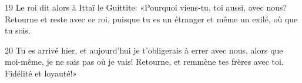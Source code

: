 
19 Le roi dit alors à Ittaï le Guittite: «Pourquoi viens-tu, toi aussi, avec nous? Retourne et reste avec ce roi, puisque tu es un étranger et même un exilé, où que tu sois.

20 Tu es arrivé hier, et aujourd’hui je t’obligerais à errer avec nous, alors que moi-même, je ne sais pas où je vais! Retourne, et remmène tes frères avec toi. Fidélité et loyauté!»